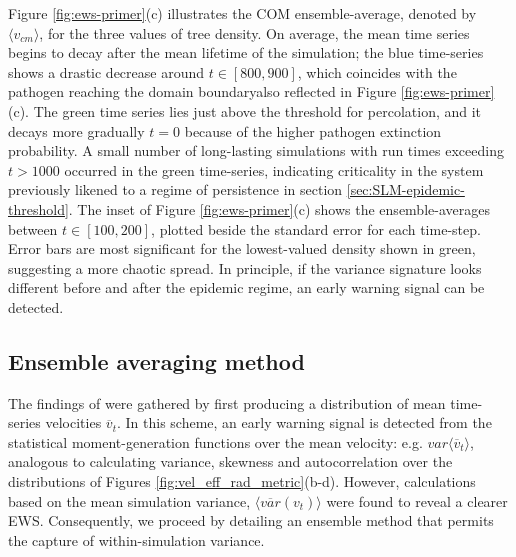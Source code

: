 Figure \ref{fig:ews-primer}(c) illustrates the COM ensemble-average, denoted by $\langle v_{cm}\rangle$, for the three values of tree density.
On average, the mean time series begins to decay after the mean lifetime of the simulation; the blue time-series shows a drastic decrease around $t \in [800, 900]$, which coincides with the pathogen reaching the domain boundary\textemdash also reflected in Figure \ref{fig:ews-primer}(c).
The green time series lies just above the threshold for percolation, and it decays more gradually $t=0$ because of the higher pathogen extinction probability. 
A small number of long-lasting simulations with run times exceeding $t>1000$ occurred in the green time-series, indicating criticality in the system\textemdash 
previously likened to a regime of persistence in section \ref{sec:SLM-epidemic-threshold}.
The inset of Figure \ref{fig:ews-primer}(c) shows the ensemble-averages between $t\in [100, 200]$, plotted beside the standard error for each time-step.
Error bars are most significant for the lowest-valued density shown in green, suggesting a more chaotic spread.
In principle, if the variance signature looks different before and after the epidemic regime, an early warning signal can be detected. 

\subsection{Ensemble averaging method}

The findings of \cite{OROZCOFUENTES201912} were gathered by first producing a distribution of mean time-series velocities $\overline{v}_t$.
In this scheme, an early warning signal is detected from the statistical moment-generation functions over the mean velocity: e.g. $var\big\langle \overline{v}_t \big\rangle$,
analogous to calculating variance, skewness and autocorrelation over the distributions of Figures \ref{fig:vel_eff_rad_metric}(b-d).
However, calculations based on the mean simulation variance, $ \big\langle \overline{var}({v}_t) \big\rangle $ were found to reveal a clearer EWS.
Consequently, we proceed by detailing an ensemble method that permits the capture of within-simulation variance. 


